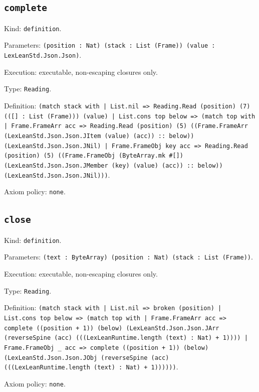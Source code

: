 \documentclass[11pt]{article}
\begin{document}
\subsection*{\texttt{complete}}
\noindent Kind: \texttt{definition}.\par
\noindent Parameters: \texttt{(position : Nat) (stack : List (Frame)) (value : LexLeanStd.Json.Json)}.\par
\noindent Execution: executable, non-escaping closures only.\par
\noindent Type: \texttt{Reading}.\par
\noindent Definition: \texttt{(match stack with | List.nil => Reading.Read (position) (7) (([] : List (Frame))) (value) | List.cons top below => (match top with | Frame.FrameArr acc => Reading.Read (position) (5) ((Frame.FrameArr (LexLeanStd.Json.Json.JItem (value) (acc)) :: below)) (LexLeanStd.Json.Json.JNil) | Frame.FrameObj key acc => Reading.Read (position) (5) ((Frame.FrameObj (ByteArray.mk \#[]) (LexLeanStd.Json.Json.JMember (key) (value) (acc)) :: below)) (LexLeanStd.Json.Json.JNil)))}.\par
\noindent Axiom policy: \texttt{none}.\par
\subsection*{\texttt{close}}
\noindent Kind: \texttt{definition}.\par
\noindent Parameters: \texttt{(text : ByteArray) (position : Nat) (stack : List (Frame))}.\par
\noindent Execution: executable, non-escaping closures only.\par
\noindent Type: \texttt{Reading}.\par
\noindent Definition: \texttt{(match stack with | List.nil => broken (position) | List.cons top below => (match top with | Frame.FrameArr acc => complete ((position + 1)) (below) (LexLeanStd.Json.Json.JArr (reverseSpine (acc) (((LexLeanRuntime.length (text) : Nat) + 1)))) | Frame.FrameObj \_ acc => complete ((position + 1)) (below) (LexLeanStd.Json.Json.JObj (reverseSpine (acc) (((LexLeanRuntime.length (text) : Nat) + 1))))))}.\par
\noindent Axiom policy: \texttt{none}.\par
\end{document}
